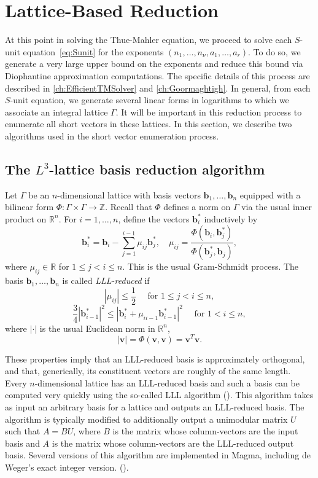 \documentclass[11pt]{report}
\theoremstyle{definition}
\begin{document}
\section{Lattice-Based Reduction}
\label{sec:LatticeReduction}

At this point in solving the Thue-Mahler equation, we proceed to solve each $S$-unit equation~\eqref{eq:Sunit} for the exponents $(n_1, \dots, n_{\nu}, a_1, \dots, a_r)$. To do so, we generate a very large upper bound on the exponents and reduce this bound via Diophantine approximation computations. The specific details of this process are described in \autoref{ch:EfficientTMSolver} and \autoref{ch:Goormaghtigh}. In general, from each $S$-unit equation, we generate several linear forms in logarithms to which we associate an integral lattice $\Gamma$. It will be important in this reduction process to enumerate all short vectors in these lattices. In this section, we describe two algorithms used in the short vector enumeration process.


\subsection{The $L^3$-lattice basis reduction algorithm}
\label{subsec:LLL}

Let $\Gamma$ be an $n$-dimensional lattice with basis vectors $\mathbf{b}_1, \dots, \mathbf{b}_n$ equipped with a bilinear form $\Phi: \Gamma \times \Gamma \to \mathbb{Z}$. Recall that $\Phi$ defines a norm on $\Gamma$ via the usual inner product on $\mathbb{R}^n$. For $i = 1, \dots, n$, define the vectors $\mathbf{b}_i^*$ inductively by
\[\mathbf{b}_i^* = \mathbf{b}_i - \sum_{j=1}^{i-1}\mu_{ij}\mathbf{b}_j^*, \quad \mu_{ij} = \frac{\Phi(\mathbf{b}_i,\mathbf{b}_j^*)}{\Phi(\mathbf{b}_j^*,\mathbf{b}_j)},\]
where $\mu_{ij} \in \mathbb{R}$ for $1\leq j < i \leq n$. This is the usual Gram-Schmidt process. The basis $\mathbf{b}_1,\dots, \mathbf{b}_n$ is called \textit{LLL-reduced} if
\[|\mu_{ij}| \leq \frac{1}{2} \quad \text{ for } 1\leq j < i \leq n, \]
\[\frac{3}{4}|\mathbf{b}_{i-1}^*|^2 \leq |\mathbf{b}_i^* + \mu_{ii-1}\mathbf{b}_{i-1}^*|^2 \quad \text{ for } 1 <i \leq n,\]
where $| \cdot |$ is the usual Euclidean norm in $\mathbb{R}^n$,
\[|\mathbf{v}| = \Phi(\mathbf{v},\mathbf{v}) = \mathbf{v}^{T}\mathbf{v}.\]

These properties imply that an LLL-reduced basis is approximately orthogonal, and that, generically, its constituent vectors are roughly of the same length. Every $n$-dimensional lattice has an LLL-reduced basis and such a basis can be computed very quickly using the so-called LLL algorithm (\cite{LLL}). This algorithm takes as input an arbitrary basis for a lattice and outputs an LLL-reduced basis. The algorithm is typically modified to additionally output a unimodular matrix $U$ such that $A = BU$, where $B$ is the matrix whose column-vectors are the input basis and $A$ is the matrix whose column-vectors are the LLL-reduced output basis. Several versions of this algorithm are implemented in Magma, including de Weger's exact integer version. (\cite{Weg0}).
\end{document}
